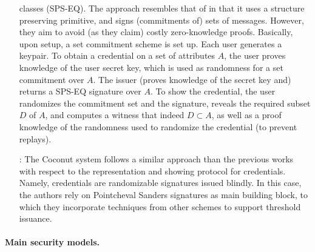 \begin{enumerate}
  classes (SPS-EQ). The approach resembles that of \cite{ckl+15} in that it
  uses a structure preserving primitive, and signs (commitments of) sets of
  messages. However, they aim to avoid (as they claim) costly zero-knowledge
  proofs. Basically, upon setup, a set commitment scheme is set up. Each user
  generates a keypair. To obtain a credential on a set of attributes $A$, the
  user proves knowledge of the user secret key, which is used as randomness
  for a set commitment over $A$. The issuer (proves knowledge of the secret
  key and) returns a SPS-EQ signature over $A$. To show the credential, the
  user randomizes the commitment set and the signature, reveals the required
  subset $D$ of $A$, and computes a witness that indeed $D \subset A$, as well
  as a proof knowledge of the randomness used to randomize the credential (to
  prevent replays). 
\item[\cite{sms+19}:] The Coconut system follows a similar approach than the previous
  works with respect to the representation and showing protocol for credentials.
  Namely, credentials are randomizable signatures issued blindly. In this case,
  the authors rely on Pointcheval Sanders signatures \cite{ps16} as main
  building block, to which they incorporate techniques from other schemes to
  support threshold issuance.
\end{enumerate}

\paragraph{Main security models.}

